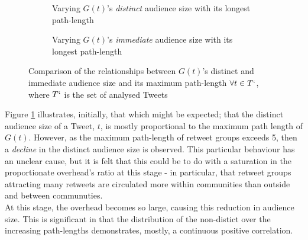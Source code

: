 \begin{figure}[h]
\begin{subfigure}{.5\textwidth}
    \centering
    \caption{Varying $G(t)$'s \textit{distinct} audience size with its longest path-length}
    \label{fig:pathlength-audience}
\end{subfigure}
\quad
\begin{subfigure}{.5\textwidth}
    \centering
    \caption{Varying $G(t)$'s \textit{immediate} audience size with its longest path-length}
    \label{fig:pathlength-immediateaudience}
\end{subfigure}
\caption{Comparison of the relationships between $G(t)$'s distinct and immediate audience size and its maximum path-length $\forall t \in T`$, where $T`$ is the set of analysed Tweets}
\end{figure}

Figure \ref{fig:pathlength-audience} illustrates, initially, that which might be expected; that the distinct audience size of a Tweet, $t$, is mostly proportional to the maximum path length of $G(t)$. However, as the maximum path-length of retweet groups exceeds 5, then a \textit{decline} in the distinct audience size is observed. This particular behaviour has an unclear cause, but it is felt that this could be to do with a saturation in the proportionate overhead's ratio at this stage - in particular, that retweet groups attracting many retweets are circulated more within communities than outside and between communuties.\\
At this stage, the overhead becomes so large, causing this reduction in audience size. This is significant in that the distribution of the non-distict over the increasing path-lengths demonstrates, mostly, a continuous positive correlation.

